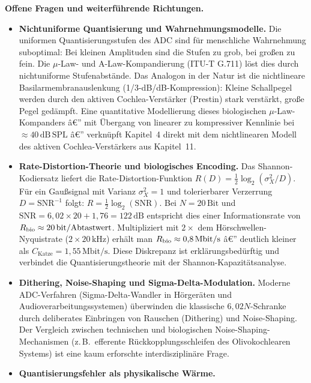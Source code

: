 ﻿\documentclass[12pt,a4paper,titlepage]{report}
\begin{document}
\textbf{Offene Fragen und weiterführende Richtungen.}
\begin{itemize}[leftmargin=2em]
  \item \textbf{Nichtuniforme Quantisierung und Wahrnehmungsmodelle.}
    Die uniformen Quantisierungsstufen des ADC sind für
    menschliche Wahrnehmung suboptimal:
    Bei kleinen Amplituden sind die Stufen zu grob,
    bei großen zu fein.
    Die $\mu$-Law- und A-Law-Kompandierung (ITU-T G.711)
    löst dies durch nichtuniforme Stufenabstände.
    Das Analogon in der Natur ist die nichtlineare
    Basilarmembranauslenkung (1/3-dB/dB-Kompression):
    Kleine Schallpegel werden durch den aktiven
    Cochlea-Verstärker (Prestin) stark verstärkt,
    große Pegel gedämpft.
    Eine quantitative Modellierung dieses biologischen
    $\mu$-Law-Kompanders â€” mit Übergang von linearer
    zu kompressiver Kennlinie bei $\approx 40\,\mathrm{dB\,SPL}$ â€”
    verknüpft Kapitel~4 direkt mit dem nichtlinearen Modell
    des aktiven Cochlea-Verstärkers aus Kapitel~11.
  \item \textbf{Rate-Distortion-Theorie und biologisches Encoding.}
    Das Shannon-Kodiersatz liefert die Rate-Distortion-Funktion
    $R(D) = \tfrac{1}{2}\log_2(\sigma_X^2/D)$.
    Für ein Gaußsignal mit Varianz $\sigma_X^2=1$ und
    tolerierbarer Verzerrung $D=\mathrm{SNR}^{-1}$ folgt:
    $R = \tfrac{1}{2}\log_2(\mathrm{SNR})$.
    Bei $N=20\,\mathrm{Bit}$ und $\mathrm{SNR}=6{,}02\times20+1{,}76=122\,\mathrm{dB}$
    entspricht dies einer Informationsrate von
    $R_{\rm bio}\approx 20\,\mathrm{bit/Abtastwert}$.
    Multipliziert mit $2 \times$ dem Hörschwellen-Nyquistrate
    ($2 \times 20\,\mathrm{kHz}$) erhält man
    $R_{\rm bio} \approx 0{,}8\,\mathrm{Mbit/s}$ â€”
    deutlich kleiner als $C_\mathrm{Katze}=1{,}55\,\mathrm{Mbit/s}$.
    Diese Diskrepanz ist erklärungsbedürftig und verbindet die
    Quantisierungstheorie mit der Shannon-Kapazitätsanalyse.
  \item \textbf{Dithering, Noise-Shaping und Sigma-Delta-Modulation.}
    Moderne ADC-Verfahren (Sigma-Delta-Wandler in Hörgeräten und
    Audioverarbeitungssystemen) überwinden die klassische
    $6{,}02N$-Schranke durch deliberates Einbringen von Rauschen
    (Dithering) und Noise-Shaping.
    Der Vergleich zwischen technischen und biologischen
    Noise-Shaping-Mechanismen (z.\,B.\ efferente Rückkopplungsschleifen
    des Olivokochlearen Systems) ist eine kaum erforschte
    interdisziplinäre Frage.
  \item \textbf{Quantisierungsfehler als physikalische Wärme.}

\end{itemize}
\end{document}

